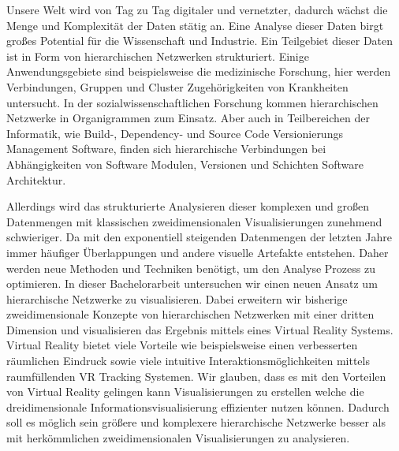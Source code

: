 Unsere Welt wird von Tag zu Tag digitaler und vernetzter, dadurch wächst die Menge und Komplexität der Daten stätig an.
Eine Analyse dieser Daten birgt großes Potential für die Wissenschaft und Industrie.
Ein Teilgebiet dieser Daten ist in Form von hierarchischen Netzwerken strukturiert. Einige Anwendungsgebiete sind beispielsweise die medizinische Forschung, hier werden Verbindungen, Gruppen und Cluster Zugehörigkeiten von Krankheiten untersucht. In der sozialwissenschaftlichen Forschung kommen hierarchischen Netzwerke in Organigrammen zum Einsatz. Aber auch in Teilbereichen der Informatik, wie Build-, Dependency- und Source Code Versionierungs Management Software, finden sich hierarchische Verbindungen bei Abhängigkeiten von Software Modulen, Versionen und Schichten Software Architektur. 

Allerdings wird das strukturierte Analysieren dieser komplexen und großen Datenmengen mit klassischen zweidimensionalen Visualisierungen zunehmend schwieriger.
Da mit den exponentiell steigenden Datenmengen der letzten Jahre immer häufiger Überlappungen und andere visuelle Artefakte entstehen. 
Daher werden neue Methoden und Techniken benötigt, um den Analyse Prozess zu optimieren. In dieser Bachelorarbeit untersuchen wir einen neuen Ansatz um hierarchische Netzwerke zu visualisieren. Dabei erweitern wir bisherige zweidimensionale Konzepte von hierarchischen Netzwerken mit einer dritten Dimension und visualisieren das Ergebnis mittels eines Virtual Reality Systems. Virtual Reality bietet viele Vorteile wie beispielsweise einen verbesserten räumlichen Eindruck sowie viele intuitive Interaktionsmöglichkeiten mittels raumfüllenden VR Tracking Systemen. 
Wir glauben, dass es mit den Vorteilen von Virtual Reality gelingen kann Visualisierungen zu erstellen welche die dreidimensionale Informationsvisualisierung effizienter nutzen können. Dadurch soll es möglich sein größere und komplexere hierarchische Netzwerke besser als mit herkömmlichen zweidimensionalen Visualisierungen zu analysieren.